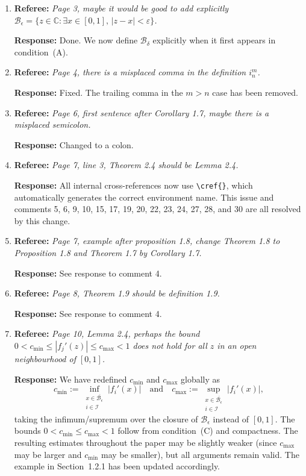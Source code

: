 \documentclass[11pt]{article}
\newcommand{\referee}[1]{\textbf{Referee:} \textit{#1}}
\newcommand{\response}[1]{\textbf{Response:} #1}
\begin{document}
\begin{enumerate}
  \item \referee{Page 3, maybe it would be good to add explicitly $\mathcal{B}_\epsilon = \{z\in\mathbb{C} : \exists x\in [0,1],\, |z-x|<\varepsilon\}$.}

  \response{Done. We now define $\mathcal{B}_\delta$ explicitly when it first appears in condition~(A).}

  \item \referee{Page 4, there is a misplaced comma in the definition $i_n^m$.}

  \response{Fixed. The trailing comma in the $m > n$ case has been removed.}

  \item \referee{Page 6, first sentence after Corollary 1.7, maybe there is a misplaced semicolon.}

  \response{Changed to a colon.}

  \item \referee{Page 7, line 3, Theorem 2.4 should be Lemma 2.4.}

  \response{All internal cross-references now use \texttt{\textbackslash cref\{\}}, which automatically generates the correct environment name. This issue and comments 5, 6, 9, 10, 15, 17, 19, 20, 22, 23, 24, 27, 28, and 30 are all resolved by this change.}

  \item \referee{Page 7, example after proposition 1.8, change Theorem 1.8 to Proposition 1.8 and Theorem 1.7 by Corollary 1.7.}

  \response{See response to comment 4.}

  \item \referee{Page 8, Theorem 1.9 should be definition 1.9.}

  \response{See response to comment 4.}

  \item \referee{Page 10, Lemma 2.4, perhaps the bound $0 < c_{\min} \leq |f_j'(z)| \leq c_{\max} < 1$ does not hold for all $z$ in an open neighbourhood of $[0,1]$.}

  \response{We have redefined $c_{\min}$ and $c_{\max}$ globally as
  \[
    c_{\min} := \inf_{\substack{x\in\overline{\mathcal{B}_\epsilon}\\ i\in\mathcal{I}}} |f_i'(x)|
    \quad\text{and}\quad
    c_{\max} := \sup_{\substack{x\in\overline{\mathcal{B}_\epsilon}\\ i\in\mathcal{I}}} |f_i'(x)|,
  \]
  taking the infimum/supremum over the closure of $\mathcal{B}_\epsilon$ instead of $[0,1]$. The bounds $0 < c_{\min} \leq c_{\max} < 1$ follow from condition~(C) and compactness. The resulting estimates throughout the paper may be slightly weaker (since $c_{\max}$ may be larger and $c_{\min}$ may be smaller), but all arguments remain valid. The example in Section~1.2.1 has been updated accordingly.}


\end{enumerate}
\end{document}
